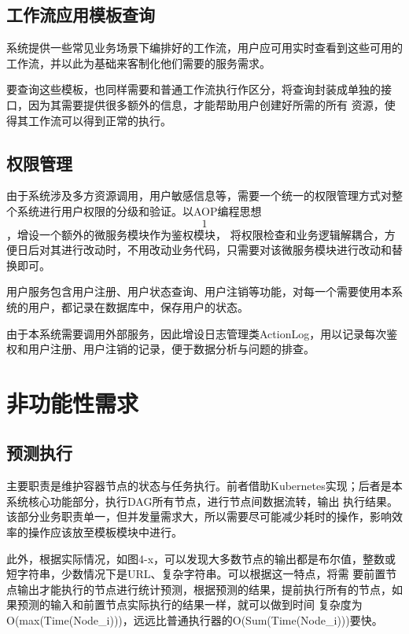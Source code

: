 \subsection{工作流应用模板查询}

系统提供一些常见业务场景下编排好的工作流，用户应可用实时查看到这些可用的工作流，并以此为基础来客制化他们需要的服务需求。

要查询这些模板，也同样需要和普通工作流执行作区分，将查询封装成单独的接口，因为其需要提供很多额外的信息，才能帮助用户创建好所需的所有
资源，使得其工作流可以得到正常的执行。

\subsection{权限管理}
由于系统涉及多方资源调用，用户敏感信息等，需要一个统一的权限管理方式对整个系统进行用户权限的分级和验证。以AOP编程思想\[1\]，增设一个额外的微服务模块作为鉴权模块，
将权限检查和业务逻辑解耦合，方便日后对其进行改动时，不用改动业务代码，只需要对该微服务模块进行改动和替换即可。


用户服务包含用户注册、用户状态查询、用户注销等功能，对每一个需要使用本系统的用户，都记录在数据库中，保存用户的状态。

由于本系统需要调用外部服务，因此增设日志管理类ActionLog，用以记录每次鉴权和用户注册、用户注销的记录，便于数据分析与问题的排查。


\section{非功能性需求}

\subsection{预测执行}

主要职责是维护容器节点的状态与任务执行。前者借助Kubernetes实现；后者是本系统核心功能部分，执行DAG所有节点，进行节点间数据流转，输出
执行结果。该部分业务职责单一，但并发量需求大，所以需要尽可能减少耗时的操作，影响效率的操作应该放至模板模块中进行。




此外，根据实际情况，如图4-x，可以发现大多数节点的输出都是布尔值，整数或短字符串，少数情况下是URL、复杂字符串。可以根据这一特点，将需
要前置节点输出才能执行的节点进行统计预测，根据预测的结果，提前执行所有的节点，如果预测的输入和前置节点实际执行的结果一样，就可以做到时间
复杂度为O(max(Time(Node\_i)))，远远比普通执行器的O(Sum(Time(Node\_i)))要快。



